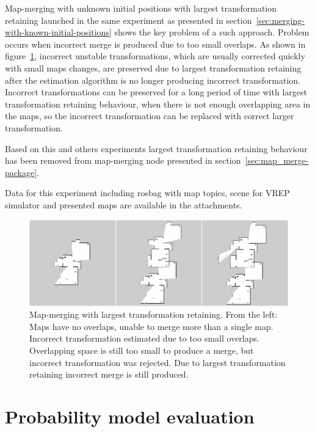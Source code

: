 Map-merging with unknown initial positions with largest transformation retaining launched in the same experiment as presented in section~\ref{sec:merging-with-known-initial-positions} shows the key problem of a such approach. Problem occurs when incorrect merge is produced due to too small overlaps. As shown in figure~\ref{fig:retaining-largest-transformation-montage}, incorrect unstable transformations, which are usually corrected quickly with small maps changes, are preserved due to largest transformation retaining after the estimation algorithm is no longer producing incorrect transformation. Incorrect transformations can be preserved for a long period of time with largest transformation retaining behaviour, when there is not enough overlapping area in the maps, so the incorrect transformation can be replaced with correct larger transformation.

Based on this and others experiments largest transformation retaining behaviour has been removed from map-merging node presented in section~\ref{sec:map_merge-package}.

Data for this experiment including rosbag with map topics, scene for \gls{VREP} simulator and presented maps are available in the attachments.

\begin{figure}
    \centering
    \includegraphics[width=5.71in]{../img/retaining-largest-transformation-montage.png}
    \caption[Map-merging with largest transformation retaining.]{Map-merging with largest transformation retaining. From the left: Maps have no overlaps, unable to merge more than a single map. Incorrect transformation estimated due to too small overlaps. Overlapping space is still too small to produce a merge, but incorrect transformation was rejected. Due to largest transformation retaining incorrect merge is still produced.}
    \label{fig:retaining-largest-transformation-montage}
\end{figure}

\section{Probability model evaluation}
\label{sec:probability-model-evaluation}

